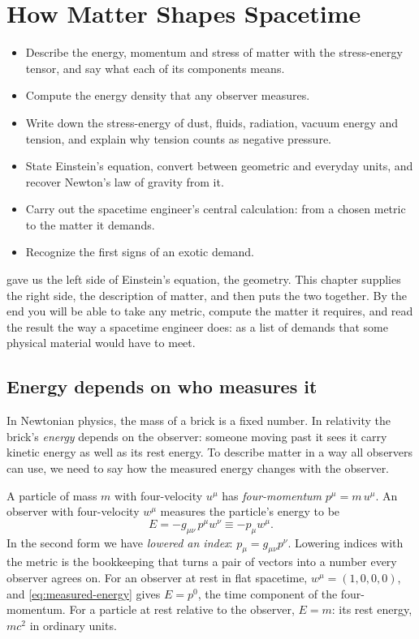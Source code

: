 \chapter{How Matter Shapes Spacetime}\label{ch:matter-geometry}

\begin{goals}
\begin{itemize}
\item Describe the energy, momentum and stress of matter with the
  stress-energy tensor, and say what each of its components means.
\item Compute the energy density that any observer measures.
\item Write down the stress-energy of dust, fluids, radiation, vacuum energy
  and tension, and explain why tension counts as negative pressure.
\item State Einstein's equation, convert between geometric and everyday units,
  and recover Newton's law of gravity from it.
\item Carry out the spacetime engineer's central calculation: from a chosen
  metric to the matter it demands.
\item Recognize the first signs of an exotic demand.
\end{itemize}
\end{goals}

 gave us the left side of Einstein's equation, the geometry.
This chapter supplies the right side, the description of matter, and then puts
the two together. By the end you will be able to take any metric, compute the
matter it requires, and read the result the way a spacetime engineer does: as
a list of demands that some physical material would have to meet.

\section{Energy depends on who measures it}\label{sec:energy-observers}

In Newtonian physics, the mass of a brick is a fixed number. In relativity the
brick's \emph{energy} depends on the observer: someone moving past it sees it
carry kinetic energy as well as its rest energy. To describe matter in a way
all observers can use, we need to say how the measured energy changes with the
observer.

A particle of mass $m$ with four-velocity $u^{\mu}$ has \emph{four-momentum}
$p^{\mu} = m\,u^{\mu}$. An observer with four-velocity $w^{\mu}$ measures the
particle's energy to be
\begin{equation}
  E = -g_{\mu\nu}\,p^{\mu}w^{\nu} \equiv -p_{\mu}w^{\mu}.
  \label{eq:measured-energy}
\end{equation}
In the second form we have \emph{lowered an index}: $p_{\mu} = g_{\mu\nu}p^{\nu}$.
Lowering indices with the metric is the bookkeeping that turns a pair of
vectors into a number every observer agrees on. For an observer at rest in flat
spacetime, $w^{\mu} = (1,0,0,0)$, and \cref{eq:measured-energy} gives $E = p^{0}$,
the time component of the four-momentum. For a particle at rest relative to the
observer, $E = m$: its rest energy, $mc^{2}$ in ordinary units.

